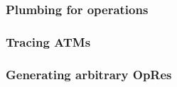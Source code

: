 \documentclass[compress,handout]{beamer}
\begin{document}


\begin{frame}[fragile]
  \frametitle{Plumbing for operations}


\end{frame}


\begin{frame}[fragile]
  \frametitle{Tracing ATMs}


\end{frame}


\begin{frame}[fragile]
  \frametitle{Generating arbitrary OpRes}

  \vspace*{-2mm}

\end{frame}
\end{document}
